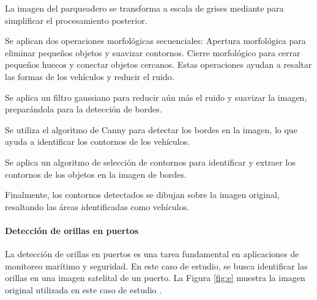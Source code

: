\begin{seriate}

   \item La imagen del parqueadero se transforma a escala de grises mediante para simplificar el procesamiento posterior.
    
    \item Se aplican dos operaciones morfológicas secuenciales: Apertura morfológica para eliminar pequeños objetos y suavizar contornos. Cierre morfológico  para cerrar pequeños huecos y conectar objetos cercanos.
    Estas operaciones ayudan a resaltar las formas de los vehículos y reducir el ruido.
    
    \item Se aplica un filtro gaussiano para reducir aún más el ruido y suavizar la imagen, preparándola para la detección de bordes.
    
    \item Se utiliza el algoritmo de Canny para detectar los bordes en la imagen, lo que ayuda a identificar los contornos de los vehículos.
    
    \item Se aplica un algoritmo de selección de contornos para identificar y extraer los contornos de los objetos en la imagen de bordes.
    
    \item Finalmente, los contornos detectados se dibujan sobre la imagen original, resaltando las áreas identificadas como vehículos.
    
    \end{seriate}

\paragraph{Detección de orillas en puertos} La detección de orillas en puertos es una tarea fundamental en aplicaciones de monitoreo marítimo y seguridad. En este caso de estudio, se busca identificar las orillas en una imagen satelital de un puerto. La Figura \ref{fig:e} muestra la imagen original utilizada en este caso de estudio \autocite{ShipsSatelliteImagery}.


